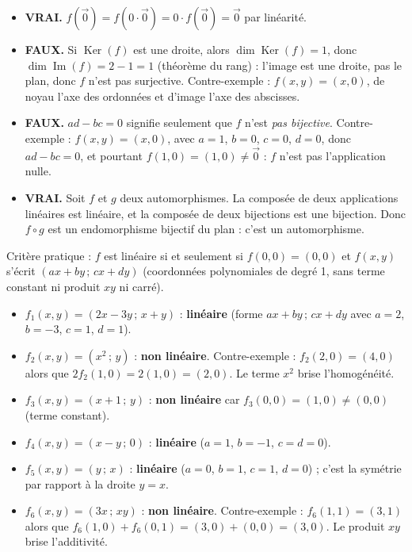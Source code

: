 \documentclass[11pt]{article}
\begin{document}
\begin{corrige}
\begin{itemize}
\item[a)] \textbf{VRAI.} $f(\vec{0})=f(0\cdot\vec{0})=0\cdot f(\vec{0})=\vec{0}$ par linéarité.
\item[b)] \textbf{FAUX.} Si $\operatorname{Ker}(f)$ est une droite, alors $\dim\operatorname{Ker}(f)=1$, donc $\dim\operatorname{Im}(f)=2-1=1$ (théorème du rang) : l'image est une droite, pas le plan, donc $f$ n'est pas surjective. Contre-exemple : $f(x,y)=(x,0)$, de noyau l'axe des ordonnées et d'image l'axe des abscisses.
\item[c)] \textbf{FAUX.} $ad-bc=0$ signifie seulement que $f$ n'est \emph{pas bijective}. Contre-exemple : $f(x,y)=(x,0)$, avec $a=1$, $b=0$, $c=0$, $d=0$, donc $ad-bc=0$, et pourtant $f(1,0)=(1,0)\neq\vec{0}$ : $f$ n'est pas l'application nulle.
\item[d)] \textbf{VRAI.} Soit $f$ et $g$ deux automorphismes. La composée de deux applications linéaires est linéaire, et la composée de deux bijections est une bijection. Donc $f\circ g$ est un endomorphisme bijectif du plan : c'est un automorphisme.
\end{itemize}
\end{corrige}

\begin{corrige}
Critère pratique : $f$ est linéaire si et seulement si $f(0,0)=(0,0)$ et $f(x,y)$ s'écrit $(ax+by\,;\,cx+dy)$ (coordonnées polynomiales de degré 1, sans terme constant ni produit $xy$ ni carré).

\begin{itemize}
\item $f_1(x,y)=(2x-3y\,;\,x+y)$ : \textbf{linéaire} (forme $ax+by\,;\,cx+dy$ avec $a=2$, $b=-3$, $c=1$, $d=1$).
\item $f_2(x,y)=(x^2\,;\,y)$ : \textbf{non linéaire}. Contre-exemple : $f_2(2,0)=(4,0)$ alors que $2f_2(1,0)=2(1,0)=(2,0)$. Le terme $x^2$ brise l'homogénéité.
\item $f_3(x,y)=(x+1\,;\,y)$ : \textbf{non linéaire} car $f_3(0,0)=(1,0)\neq(0,0)$ (terme constant).
\item $f_4(x,y)=(x-y\,;\,0)$ : \textbf{linéaire} ($a=1$, $b=-1$, $c=d=0$).
\item $f_5(x,y)=(y\,;\,x)$ : \textbf{linéaire} ($a=0$, $b=1$, $c=1$, $d=0$) ; c'est la symétrie par rapport à la droite $y=x$.
\item $f_6(x,y)=(3x\,;\,xy)$ : \textbf{non linéaire}. Contre-exemple : $f_6(1,1)=(3,1)$ alors que $f_6(1,0)+f_6(0,1)=(3,0)+(0,0)=(3,0)$. Le produit $xy$ brise l'additivité.
\end{itemize}
\end{corrige}
\end{document}
